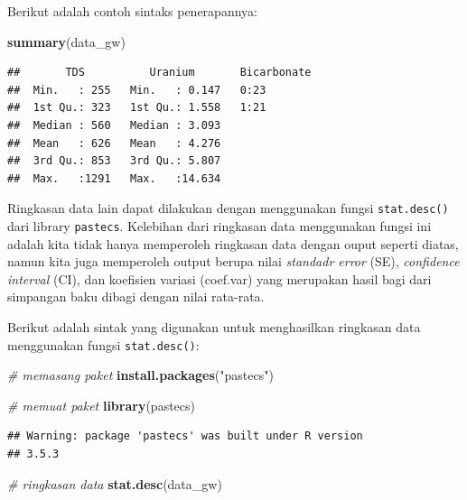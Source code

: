 \documentclass[]{book}
\newenvironment{Shaded}{\begin{snugshade}}{\end{snugshade}}
\newcommand{\KeywordTok}[1]{\textcolor[rgb]{0.13,0.29,0.53}{\textbf{#1}}}
\newcommand{\StringTok}[1]{\textcolor[rgb]{0.31,0.60,0.02}{#1}}
\newcommand{\CommentTok}[1]{\textcolor[rgb]{0.56,0.35,0.01}{\textit{#1}}}
\newcommand{\NormalTok}[1]{#1}
\begin{document}
Berikut adalah contoh sintaks penerapannya:

\begin{Shaded}
\begin{Highlighting}[]
\KeywordTok{summary}\NormalTok{(data_gw)}
\end{Highlighting}
\end{Shaded}

\begin{verbatim}
##       TDS          Uranium       Bicarbonate
##  Min.   : 255   Min.   : 0.147   0:23       
##  1st Qu.: 323   1st Qu.: 1.558   1:21       
##  Median : 560   Median : 3.093              
##  Mean   : 626   Mean   : 4.276              
##  3rd Qu.: 853   3rd Qu.: 5.807              
##  Max.   :1291   Max.   :14.634
\end{verbatim}

Ringkasan data lain dapat dilakukan dengan menggunakan fungsi
\texttt{stat.desc()} dari library \texttt{pastecs}. Kelebihan dari
ringkasan data menggunakan fungsi ini adalah kita tidak hanya memperoleh
ringkasan data dengan ouput seperti diatas, namun kita juga memperoleh
output berupa nilai \emph{standadr error} (SE), \emph{confidence
interval} (CI), dan koefisien variasi (coef.var) yang merupakan hasil
bagi dari simpangan baku dibagi dengan nilai rata-rata.

Berikut adalah sintak yang digunakan untuk menghasilkan ringkasan data
menggunakan fungsi \texttt{stat.desc()}:

\begin{Shaded}
\begin{Highlighting}[]
\CommentTok{# memasang paket}
\KeywordTok{install.packages}\NormalTok{(}\StringTok{"pastecs"}\NormalTok{)}
\end{Highlighting}
\end{Shaded}

\begin{Shaded}
\begin{Highlighting}[]
\CommentTok{# memuat paket}
\KeywordTok{library}\NormalTok{(pastecs)}
\end{Highlighting}
\end{Shaded}

\begin{verbatim}
## Warning: package 'pastecs' was built under R version
## 3.5.3
\end{verbatim}

\begin{Shaded}
\begin{Highlighting}[]
\CommentTok{# ringkasan data}
\KeywordTok{stat.desc}\NormalTok{(data_gw)}
\end{Highlighting}
\end{Shaded}
\end{document}
